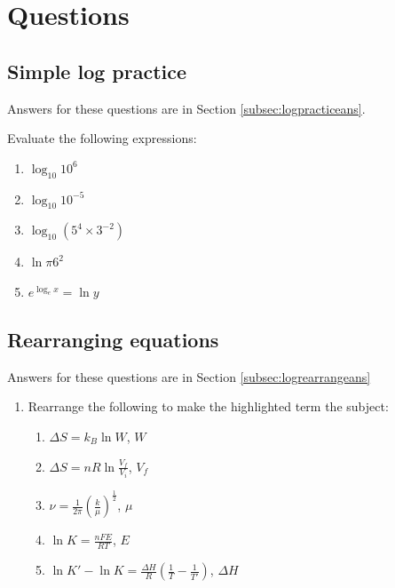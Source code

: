 \documentclass[
]{book}
\providecommand{\tightlist}{%
  \setlength{\itemsep}{0pt}\setlength{\parskip}{0pt}}
\begin{document}
\hypertarget{sec:Questions2}{%
\section{Questions}\label{sec:Questions2}}

\hypertarget{sec:logpractice}{%
\subsection{Simple log practice}\label{sec:logpractice}}

Answers for these questions are in Section \ref{subsec:logpracticeans}.

Evaluate the following expressions:

\begin{enumerate}
\def\labelenumi{\arabic{enumi}.}
\tightlist
\item
  \(\log_{10} 10^6\)
\item
  \(\log_{10} 10^{-5}\)
\item
  \(\log_{10} (5^4 \times 3^{-2})\)
\item
  \(\ln {\pi 6^2}\)
\item
  \(e^{\log_e x}=\ln y\)
\end{enumerate}

\hypertarget{sec:logrearrange}{%
\subsection{Rearranging equations}\label{sec:logrearrange}}

Answers for these questions are in Section \ref{subsec:logrearrangeans}

\begin{enumerate}
\def\labelenumi{\arabic{enumi}.}
\tightlist
\item
  Rearrange the following to make the highlighted term the subject:

  \begin{enumerate}
  \def\labelenumii{\alph{enumii}.}
  \tightlist
  \item
    \(\Delta S = k_B \ln W\), \(W\)
  \item
    \(\Delta S = nR \ln \frac{V_f}{V_i}\), \(V_f\)
  \item
    \(\nu =\frac{1}{2 \pi} \left(\frac{k}{\mu}\right)^\frac{1}{2}\), \(\mu\)
  \item
    \(\ln K = \frac{nFE}{RT}\), \(E\)
  \item
    \(\ln K'- \ln K = \frac{\Delta H}{R}\left(\frac{1}{T}-\frac{1}{T'}\right)\), \(\Delta H\)
  \end{enumerate}
\end{enumerate}
\end{document}
